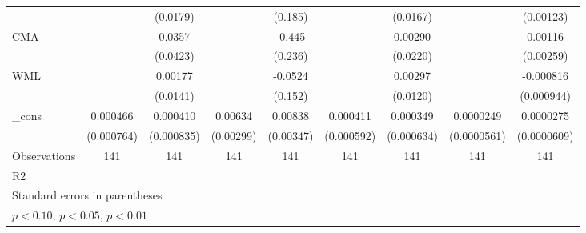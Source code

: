 \begin{table}[htbp]
\begin{tabular}{l*{8}{c}}
                    &                     &    (0.0179)         &                     &     (0.185)         &                     &    (0.0167)         &                     &   (0.00123)         \\
CMA                 &                     &      0.0357         &                     &      -0.445\sym{*}  &                     &     0.00290         &                     &     0.00116         \\
                    &                     &    (0.0423)         &                     &     (0.236)         &                     &    (0.0220)         &                     &   (0.00259)         \\
WML                 &                     &     0.00177         &                     &     -0.0524         &                     &     0.00297         &                     &   -0.000816         \\
                    &                     &    (0.0141)         &                     &     (0.152)         &                     &    (0.0120)         &                     &  (0.000944)         \\
\_cons              &    0.000466         &    0.000410         &     0.00634\sym{**} &     0.00838\sym{**} &    0.000411         &    0.000349         &   0.0000249         &   0.0000275         \\
                    &  (0.000764)         &  (0.000835)         &   (0.00299)         &   (0.00347)         &  (0.000592)         &  (0.000634)         & (0.0000561)         & (0.0000609)         \\
\hline
Observations        &         141         &         141         &         141         &         141         &         141         &         141         &         141         &         141         \\
R2                  &                     &                     &                     &                     &                     &                     &                     &                     \\
\hline\hline
\multicolumn{9}{l}{\footnotesize Standard errors in parentheses}\\
\multicolumn{9}{l}{\footnotesize \sym{*} \(p<0.10\), \sym{**} \(p<0.05\), \sym{***} \(p<0.01\)}\\
\end{tabular}
\end{table}
